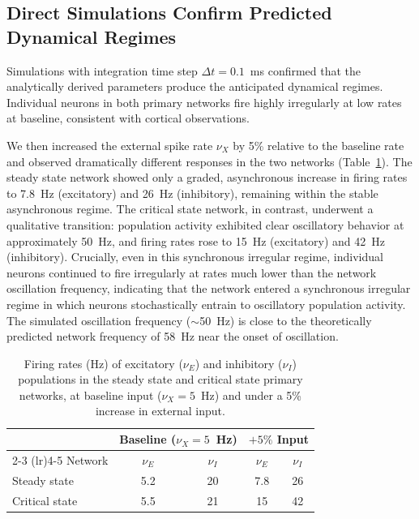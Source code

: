 \documentclass[10pt]{article}
\begin{document}
\subsection{Direct Simulations Confirm Predicted Dynamical Regimes}

Simulations with integration time step $\Delta t = 0.1$~ms confirmed that
the analytically derived parameters produce the anticipated dynamical
regimes. Individual neurons in both primary networks fire highly irregularly
at low rates at baseline, consistent with cortical observations.

We then increased the external spike rate $\nu_X$ by 5\% relative to the
baseline rate and observed dramatically different responses in the two
networks (Table~\ref{tab:firing_rates}). The steady state network showed
only a graded, asynchronous increase in firing rates to 7.8~Hz (excitatory)
and 26~Hz (inhibitory), remaining within the stable asynchronous regime. The
critical state network, in contrast, underwent a qualitative transition:
population activity exhibited clear oscillatory behavior at approximately
50~Hz, and firing rates rose to 15~Hz (excitatory) and 42~Hz (inhibitory).
Crucially, even in this synchronous irregular regime, individual neurons
continued to fire irregularly at rates much lower than the network oscillation
frequency, indicating that the network entered a synchronous irregular regime
in which neurons stochastically entrain to oscillatory population activity.
The simulated oscillation frequency ($\sim$50~Hz) is close to the
theoretically predicted network frequency of 58~Hz near the onset of
oscillation.

\begin{table}[htbp]
\centering
\caption{Firing rates (Hz) of excitatory ($\nu_E$) and inhibitory ($\nu_I$)
populations in the steady state and critical state primary networks, at
baseline input ($\nu_X = 5$~Hz) and under a 5\% increase in external input.}
\label{tab:firing_rates}
\begin{tabular}{lcccc}
\toprule
& \multicolumn{2}{c}{Baseline ($\nu_X = 5$~Hz)} & \multicolumn{2}{c}{$+5\%$ Input} \\
\cmidrule(lr){2-3} \cmidrule(lr){4-5}
Network & $\nu_E$ & $\nu_I$ & $\nu_E$ & $\nu_I$ \\
\midrule
Steady state & 5.2 & 20 & 7.8 & 26 \\
Critical state & 5.5 & 21 & 15 & 42 \\
\bottomrule
\end{tabular}
\end{table}
\end{document}
